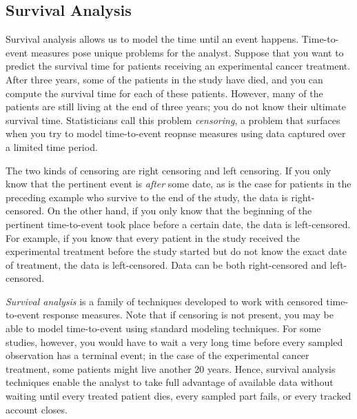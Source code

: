 \documentclass[a4paper,11pt]{article}
\begin{document}

\subsection{Survival Analysis}
\label{subsec:survprimer}

Survival analysis allows us to model the time until an event happens. Time-to-event measures pose unique problems for the analyst. Suppose that you want to predict the survival time for patients receiving an experimental cancer treatment. After three years, some of the patients in the study have died, and you can compute the survival time for each of these patients. However, many of the patients are still living at the end of three years; you do not know their ultimate survival time. Statisticians call this problem \textit{censoring}, a problem that surfaces when you try to model time-to-event reopnse measures using data captured over a limited time period.

The two kinds of censoring are right censoring and left censoring. If you only know that the pertinent event is 
\textit{after} some date, as is the case for patients in the preceding example who survive to the end of the study, the data is right-censored. On the other hand, if you only know that the beginning of the pertinent time-to-event took place before a certain date, the data is left-censored. For example, if you know that every patient in the study received the experimental treatment before the study started but do not know the exact date of treatment, the data is left-censored. Data can be both right-censored and left-censored.


\textit{Survival analysis} is a family of techniques developed to work with censored time-to-event response measures. Note that if censoring is not present, you may be able to model time-to-event using standard modeling techniques. For some studies, however, you would have to wait a very long time before every sampled observation has a terminal event; in the case of the experimental cancer treatment, some patients might live another 20 years. Hence, survival analysis techniques enable the analyst to take full advantage of available data without waiting until every treated patient dies, every sampled part fails, or every tracked account closes.

\end{document}
